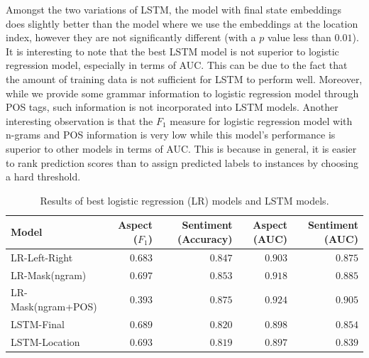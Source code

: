 \documentclass[11pt]{article}
\begin{document}
    Amongst the two variations of LSTM, the model with final state embeddings does slightly better than the model where we use the embeddings at the location index, however they are not significantly different (with a $p$ value less than $0.01$). It is interesting to note that the best LSTM model is not superior to logistic regression model, especially in terms of AUC. This can be due to the fact that the amount of training data is not sufficient for LSTM to perform well. Moreover, while we provide some grammar information to logistic regression model through POS tags, such information is not incorporated into LSTM models. Another interesting observation is that the $F_1$ measure for logistic regression model with n-grams and POS information is very low while this model's performance is superior to other models in terms of AUC. This is because in general, it is easier to rank prediction scores than to assign predicted labels to instances by choosing a hard threshold.
    \begin{table}[ht]
        \centering
        \begin{tabular}{l|r | r || r | r}
            Model    & Aspect ($F_1$) & Sentiment (Accuracy) & Aspect (AUC) & Sentiment (AUC) \\
            \hline
            LR-Left-Right&   $0.683$         &   $0.847$             &   $0.903$             &   $0.875$             \\
            LR-Mask(ngram)&   $\mathbf{0.697}$         &   $0.853$             &   $0.918$             &   $0.885$             \\
            LR-Mask(ngram+POS)&   $\mathit{0.393}$         &   $\mathbf{0.875}$    &   $\mathbf{0.924}$    &   $\mathbf{0.905}$    \\
            \hline      
            LSTM-Final&   $0.689$    &   $0.820$             &   $0.898$             &   $0.854$             \\
            LSTM-Location&   $\mathbf{0.693}$    &   $0.819$             &   $0.897$             &   $0.839$             \\
        \end{tabular}
        \caption{Results of best logistic regression (LR) models and LSTM models.}
        \label{tab:results_models}
    \end{table}
    
\end{document}

